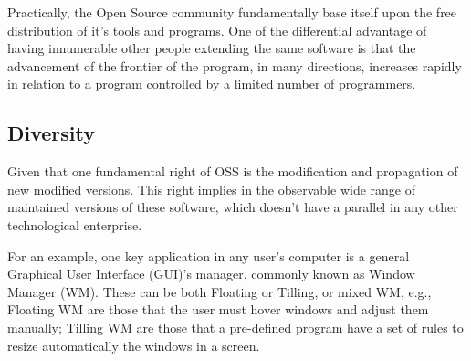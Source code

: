 \documentclass[
12pt,				%
openright,			%
oneside,			%
a4paper,			%
brazil,				%
english,			%
]{abntex2}
\begin{document}

Practically, the Open Source community fundamentally base itself upon
the free distribution of it's tools and programs. One of the differential
advantage of having innumerable other people extending the same
software is that the advancement of the frontier of the program, in
many directions, increases rapidly in relation to a program controlled
by a limited number of programmers.


\subsection{Diversity}
\label{sec:diversity}

Given that one fundamental right of OSS is the modification and
propagation of new modified versions. This right implies in the
observable wide range of maintained versions of these software, which
doesn't have a parallel in any other technological enterprise. 

For an example, one key application in any user's computer is a general
Graphical User Interface (GUI)'s manager, commonly known as Window
Manager (WM). These can be both Floating or Tilling, or mixed WM,
e.g., Floating WM are those that the user must hover windows and
adjust them manually; Tilling WM are those that a pre-defined program
have a set of rules to resize automatically the windows in a screen.

\end{document}
